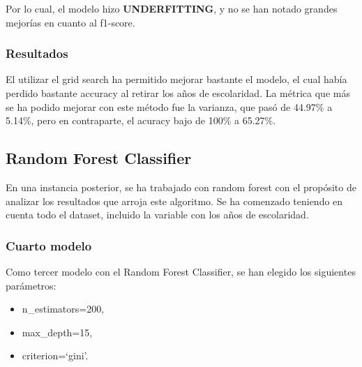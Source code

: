 \documentclass[a4paper]{article}
\begin{document}
            Por lo cual, el modelo hizo \textbf{UNDERFITTING}, y no se han notado grandes mejorías en cuanto al f1-score.

            \subsubsection*{Resultados}

            El utilizar el grid search ha permitido mejorar bastante el modelo, el cual había perdido bastante accuracy al retirar los años de escolaridad. La métrica que más se ha podido mejorar con este método fue la varianza, que pasó de 44.97\% a 5.14\%, pero en contraparte, el acuracy bajo de 100\% a 65.27\%.

    \subsection{Random Forest Classifier}
        
        En una instancia posterior, se ha trabajado con random forest con el propósito de analizar los resultados que arroja este algoritmo. Se ha comenzado teniendo en cuenta todo el dataset, incluido la variable con los años de escolaridad. 

        \subsubsection{Cuarto modelo}

            Como tercer modelo con el Random Forest Classifier, se han elegido los siguientes parámetros:
            \begin{itemize}
                \item n\_estimators=200,
                \item max\_depth=15,
                \item criterion=`gini'.
            \end{itemize}
\end{document}
